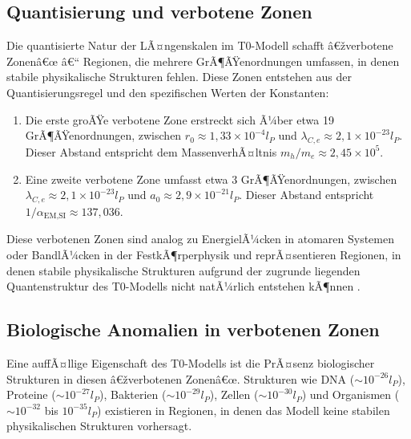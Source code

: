 ﻿\documentclass[twocolumn,aps,prl]{revtex4-2}
\begin{document}
{{{{{{{{{										\subsection{Quantisierung und verbotene Zonen}
										\label{subsec:quantization}
										
										Die quantisierte Natur der LÃ¤ngenskalen im T0-Modell schafft â€žverbotene Zonenâ€œ â€“ Regionen, die mehrere GrÃ¶ÃŸenordnungen umfassen, in denen stabile physikalische Strukturen fehlen. Diese Zonen entstehen aus der Quantisierungsregel und den spezifischen Werten der Konstanten:
										
										\begin{enumerate}
											\item Die erste groÃŸe verbotene Zone erstreckt sich Ã¼ber etwa 19 GrÃ¶ÃŸenordnungen, zwischen \(r_0 \approx 1{,}33 \times 10^{-4} l_P\) und \(\lambda_{C,e} \approx 2{,}1 \times 10^{-23} l_P\). Dieser Abstand entspricht dem MassenverhÃ¤ltnis \(m_h/m_e \approx 2{,}45 \times 10^5\).
											\item Eine zweite verbotene Zone umfasst etwa 3 GrÃ¶ÃŸenordnungen, zwischen \(\lambda_{C,e} \approx 2{,}1 \times 10^{-23} l_P\) und \(a_0 \approx 2{,}9 \times 10^{-21} l_P\). Dieser Abstand entspricht \(1/\alpha_{\text{EM,SI}} \approx 137{,}036\).
										\end{enumerate}
										
										Diese verbotenen Zonen sind analog zu EnergielÃ¼cken in atomaren Systemen oder BandlÃ¼cken in der FestkÃ¶rperphysik und reprÃ¤sentieren Regionen, in denen stabile physikalische Strukturen aufgrund der zugrunde liegenden Quantenstruktur des T0-Modells nicht natÃ¼rlich entstehen kÃ¶nnen \cite{pascher_higgs_2025}.
										
										\subsection{Biologische Anomalien in verbotenen Zonen}
										\label{subsec:bio_anomalies}
										
										Eine auffÃ¤llige Eigenschaft des T0-Modells ist die PrÃ¤senz biologischer Strukturen in diesen â€žverbotenen Zonenâ€œ. Strukturen wie DNA (\(\sim 10^{-26} l_P\)), Proteine (\(\sim 10^{-27} l_P\)), Bakterien (\(\sim 10^{-29} l_P\)), Zellen (\(\sim 10^{-30} l_P\)) und Organismen (\(\sim 10^{-32}\) bis \(10^{-35} l_P\)) existieren in Regionen, in denen das Modell keine stabilen physikalischen Strukturen vorhersagt.
										
}}}}}}}}}
\end{document}
